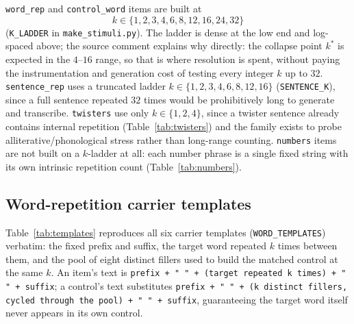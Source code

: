 \documentclass[11pt]{article}
\begin{document}
\texttt{word\_rep} and \texttt{control\_word} items are built at
$$k \in \{1,2,3,4,6,8,12,16,24,32\}$$
(\texttt{K\_LADDER} in \texttt{make\_stimuli.py}). The ladder is dense at the
low end and log-spaced above; the source comment explains why directly: the
collapse point $k^\ast$ is expected in the $4$--$16$ range, so that is where
resolution is spent, without paying the instrumentation and generation cost
of testing every integer $k$ up to $32$. \texttt{sentence\_rep} uses a
truncated ladder $k\in\{1,2,3,4,6,8,12,16\}$ (\texttt{SENTENCE\_K}), since a
full sentence repeated $32$ times would be prohibitively long to generate and
transcribe. \texttt{twisters} use only $k\in\{1,2,4\}$, since a twister
sentence already contains internal repetition (Table~\ref{tab:twisters}) and
the family exists to probe alliterative/phonological stress rather than
long-range counting. \texttt{numbers} items are not built on a $k$-ladder at
all: each number phrase is a single fixed string with its own intrinsic
repetition count (Table~\ref{tab:numbers}).

\subsection{Word-repetition carrier templates}

Table~\ref{tab:templates} reproduces all six carrier templates
(\texttt{WORD\_TEMPLATES}) verbatim: the fixed prefix and suffix, the target
word repeated $k$ times between them, and the pool of eight distinct fillers
used to build the matched control at the same $k$. An item's text is
\texttt{prefix + " " + (target repeated k times) + " " + suffix}; a control's
text substitutes \texttt{prefix + " " + (k distinct fillers, cycled through
the pool) + " " + suffix}, guaranteeing the target word itself never appears
in its own control.
\end{document}
